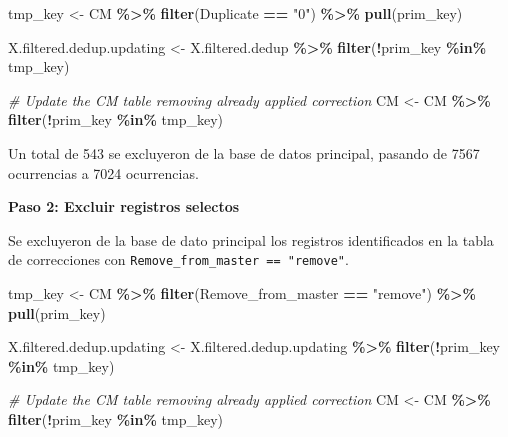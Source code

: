 \documentclass[sn-apa,pdflatex]{sn-jnl}
\newenvironment{Shaded}{\begin{snugshade}}{\end{snugshade}}
\newcommand{\CommentTok}[1]{\textcolor[rgb]{0.56,0.35,0.01}{\textit{#1}}}
\newcommand{\FunctionTok}[1]{\textcolor[rgb]{0.13,0.29,0.53}{\textbf{#1}}}
\newcommand{\NormalTok}[1]{#1}
\newcommand{\OtherTok}[1]{\textcolor[rgb]{0.56,0.35,0.01}{#1}}
\newcommand{\SpecialCharTok}[1]{\textcolor[rgb]{0.81,0.36,0.00}{\textbf{#1}}}
\newcommand{\StringTok}[1]{\textcolor[rgb]{0.31,0.60,0.02}{#1}}
\begin{document}
\begin{Shaded}
\begin{Highlighting}[]
\NormalTok{tmp\_key }\OtherTok{\textless{}{-}}\NormalTok{ CM }\SpecialCharTok{\%\textgreater{}\%}
    \FunctionTok{filter}\NormalTok{(Duplicate }\SpecialCharTok{==} \StringTok{"0"}\NormalTok{) }\SpecialCharTok{\%\textgreater{}\%}
    \FunctionTok{pull}\NormalTok{(prim\_key)}

\NormalTok{X.filtered.dedup.updating }\OtherTok{\textless{}{-}}\NormalTok{ X.filtered.dedup }\SpecialCharTok{\%\textgreater{}\%}
    \FunctionTok{filter}\NormalTok{(}\SpecialCharTok{!}\NormalTok{prim\_key }\SpecialCharTok{\%in\%}\NormalTok{ tmp\_key)}

\CommentTok{\# Update the CM table removing already applied correction}
\NormalTok{CM }\OtherTok{\textless{}{-}}\NormalTok{ CM }\SpecialCharTok{\%\textgreater{}\%}
    \FunctionTok{filter}\NormalTok{(}\SpecialCharTok{!}\NormalTok{prim\_key }\SpecialCharTok{\%in\%}\NormalTok{ tmp\_key)}
\end{Highlighting}
\end{Shaded}

Un total de 543 se excluyeron de la base de datos principal, pasando de
7567 ocurrencias a 7024 ocurrencias.

\textbf{Paso 2: Excluir registros selectos}

Se excluyeron de la base de dato principal los registros identificados
en la tabla de correcciones con
\texttt{Remove\_from\_master\ ==\ "remove"}.

\begin{Shaded}
\begin{Highlighting}[]
\NormalTok{tmp\_key }\OtherTok{\textless{}{-}}\NormalTok{ CM }\SpecialCharTok{\%\textgreater{}\%}
    \FunctionTok{filter}\NormalTok{(Remove\_from\_master }\SpecialCharTok{==} \StringTok{"remove"}\NormalTok{) }\SpecialCharTok{\%\textgreater{}\%}
    \FunctionTok{pull}\NormalTok{(prim\_key)}

\NormalTok{X.filtered.dedup.updating }\OtherTok{\textless{}{-}}\NormalTok{ X.filtered.dedup.updating }\SpecialCharTok{\%\textgreater{}\%}
    \FunctionTok{filter}\NormalTok{(}\SpecialCharTok{!}\NormalTok{prim\_key }\SpecialCharTok{\%in\%}\NormalTok{ tmp\_key)}

\CommentTok{\# Update the CM table removing already applied correction}
\NormalTok{CM }\OtherTok{\textless{}{-}}\NormalTok{ CM }\SpecialCharTok{\%\textgreater{}\%}
    \FunctionTok{filter}\NormalTok{(}\SpecialCharTok{!}\NormalTok{prim\_key }\SpecialCharTok{\%in\%}\NormalTok{ tmp\_key)}
\end{Highlighting}
\end{Shaded}
\end{document}
